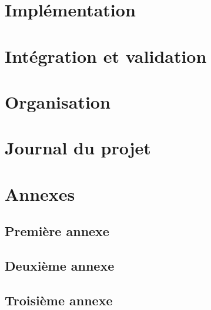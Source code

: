 \documentclass[12pt,fleqn]{book} %
\begin{document}
\part{Implémentation}


 


\part{Intégration et validation}



\part{Organisation}


\part{Journal du projet}



\appendix
\part{Annexes}
\chapter{Première annexe}



\chapter{Deuxième annexe}
\chapter{Troisième annexe}
\end{document}
